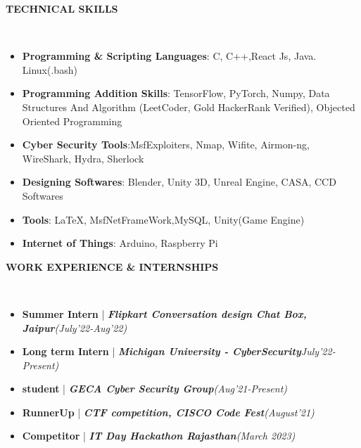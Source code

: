 \documentclass[a4paper,10pt]{article}
\newcommand{\resheading}[1]{{\small \colorbox{mygrey}{\begin{minipage}{0.99\textwidth}{\textbf{#1 \vphantom{p\^{E}}}}\end{minipage}}}}
\begin{document}
\noindent
\resheading{\textbf{TECHNICAL SKILLS}}\\[-0.4cm]
 \begin{itemize}
  \item \textbf{Programming \& Scripting Languages}: C, C++,React Js, Java. Linux(.bash)\\[-0.6cm]
  \item \textbf{Programming Addition Skills}: TensorFlow, PyTorch, Numpy, Data Structures And Algorithm (LeetCoder, Gold HackerRank Verified), Objected Oriented Programming \\[-0.6cm]
  \item \textbf{Cyber Security Tools}:MsfExploiters, Nmap, Wifite, Airmon-ng, WireShark, Hydra, Sherlock\\[-0.5cm]
  \item \textbf{Designing Softwares}: Blender, Unity 3D, Unreal Engine, CASA, CCD Softwares\\[-0.5cm]
  \item \textbf{Tools}: \LaTeX, MsfNetFrameWork,MySQL, Unity(Game Engine)\\[-0.5cm]
  \item \textbf{Internet of Things}: Arduino, Raspberry Pi\\[-0.5cm]
  \end{itemize}

\noindent
\resheading{\textbf{WORK EXPERIENCE \& INTERNSHIPS}}\\[-0.3cm]
\begin{itemize}
    
     \item \textbf{Summer Intern} | \textbf{\emph{Flipkart Conversation design Chat Box, Jaipur}}\hfill \emph{(July’22-Aug'22)}\\[-0.6cm]
    \item \textbf{Long term Intern} | \textbf{\emph{Michigan University - CyberSecurity}}\hfill \emph{July’22-Present)}\\[-0.6cm]
    \item \textbf{student} | \textbf{\emph{GECA Cyber Security Group}}\hfill \emph{(Aug’21-Present)}\\[-0.6cm]
    \item \textbf{RunnerUp} | \textbf{\emph{CTF competition, CISCO Code Fest}}\hfill \emph{(August’21)}\\[-0.6cm]
    \item \textbf{Competitor} | \textbf{\emph{IT Day Hackathon Rajasthan}}\hfill \emph{(March 2023)}\\[-0.6cm]
    \
\end{itemize}
\end{document}
